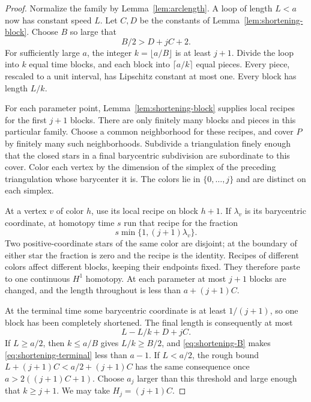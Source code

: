 \begin{proof}
Normalize the family by Lemma~\ref{lem:arclength}.  A loop of length
$L<a$ now has constant speed $L$.  Let $C,D$ be the constants of
Lemma~\ref{lem:shortening-block}.  Choose $B$ so large that
\begin{equation}\label{eq:shortening-B}
 B/2>D+jC+2.
\end{equation}
For sufficiently large $a$, the integer $k=\lfloor a/B\rfloor$ is at
least $j+1$.  Divide the loop into $k$ equal time blocks, and each block
into $\lceil a/k\rceil$ equal pieces.  Every piece, rescaled to a unit
interval, has Lipschitz constant at most one.  Every block has length
$L/k$.

For each parameter point, Lemma~\ref{lem:shortening-block} supplies
local recipes for the first $j+1$ blocks.  There are only finitely many
blocks and pieces in this particular family.  Choose a common
neighborhood for these recipes, and cover $P$ by finitely many such
neighborhoods.  Subdivide a triangulation finely enough that the closed
stars in a final barycentric subdivision are subordinate to this cover.
Color each vertex by the dimension of the simplex of the preceding
triangulation whose barycenter it is.  The colors lie in
$\{0,\ldots,j\}$ and are distinct on each simplex.

At a vertex $v$ of color $h$, use its local recipe on block $h+1$.
If $\lambda_v$ is its barycentric coordinate, at homotopy time $s$ run
that recipe for the fraction
\[
 s\min\{1,(j+1)\lambda_v\}.
\]
Two positive-coordinate stars of the same color are disjoint; at the
boundary of either star the fraction is zero and the recipe is the
identity.  Recipes of different colors affect different blocks, keeping
their endpoints fixed.  They therefore paste to one continuous $H^1$
homotopy.  At each parameter at most $j+1$ blocks are changed, and the
length throughout is less than $a+(j+1)C$.

At the terminal time some barycentric coordinate is at least
$1/(j+1)$, so one block has been completely shortened.  The final length
is consequently at most
\begin{equation}\label{eq:shortening-terminal}
 L-L/k+D+jC.
\end{equation}
If $L\ge a/2$, then $k\le a/B$ gives $L/k\ge B/2$, and
\eqref{eq:shortening-B} makes \eqref{eq:shortening-terminal} less than
$a-1$.  If $L<a/2$, the rough bound
$L+(j+1)C<a/2+(j+1)C$ has the same consequence once
$a>2((j+1)C+1)$.  Choose $a_j$ larger than this threshold and large
enough that $k\ge j+1$.  We may take $H_j=(j+1)C$.
\end{proof}

